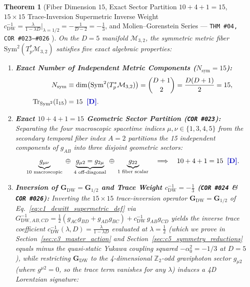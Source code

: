 \documentclass[11pt,a4paper]{article}
\newcommand{\catD}{\text{\textbf{\textcolor{blue!75!black}{[D]}}}}
\theoremstyle{definition}
\theoremstyle{plain}
\newtheorem{theorem}[axiom]{Theorem}
\theoremstyle{remark}
\begin{document}
\begin{theorem}[Fiber Dimension $15$, Exact Sector Partition $10 + 4 + 1 = 15$, $15\times 15$ Trace-Inversion Supermetric Inverse Weight $c_{\mathrm{DW}}^{-1} = \frac{\lambda}{1 - \lambda D}\big|_{\lambda=1/2} = -\frac{1}{D-2} = -\frac{1}{3}$, and Molien--Gorenstein Series --- \texttt{THM~\#04, COR~\#023--\#026} \catD]\label{thm:c1_metric_15_components}\label{thm:c1_metric_splitting}
On the $D = 5$ manifold $\mathcal{M}_{3,2}$, the symmetric metric fiber $\mathrm{Sym}^2(T^*_p\mathcal{M}_{3,2})$ satisfies five exact algebraic properties:
\begin{enumerate}[label=(\roman*)]
  \item \textbf{Exact Number of Independent Metric Components ($N_{\mathrm{sym}} = 15$):}
  \begin{align}
  N_{\mathrm{sym}} &\equiv \dim\!\left(\mathrm{Sym}^2(T^*_p\mathcal{M}_{3,2})\right) = \binom{D+1}{2} = \frac{D(D+1)}{2} = 15, \nonumber \\[3pt]
  \mathrm{Tr}_{\mathrm{Sym}^2}\!\left(\mathbb{I}_{15}\right) &= 15 \;\;\catD. \label{eq:c1_dim_sym2_15}
  \end{align}
  \item \textbf{Exact $10 + 4 + 1 = 15$ Geometric Sector Partition (\texttt{COR~\#023}):}
  Separating the four macroscopic spacetime indices $\mu,\nu \in \{1,3,4,5\}$ from the secondary temporal fiber index $A = 2$ partitions the 15 independent components of $g_{AB}$ into three disjoint geometric sectors:
  \begin{equation}\label{eq:c1_10_4_1_partition}
  \underbrace{g_{\mu\nu}}_{10\text{ macroscopic}} \;\oplus\;
  \underbrace{g_{\mu 2} = g_{2\mu}}_{4\text{ off-diagonal}} \;\oplus\;
  \underbrace{g_{22}}_{1\text{ fiber scalar}}
  \quad \Longrightarrow \quad 10 + 4 + 1 = 15 \;\;\catD.
  \end{equation}
  \item \textbf{Inversion of $\mathbf{G}_{\mathrm{DW}} = \mathbf{G}_{1/2}$ and Trace Weight $c_{\mathrm{DW}}^{-1} = -\frac{1}{3}$ (\texttt{COR~\#024} \& \texttt{COR~\#026}):}
  Inverting the $15\times 15$ trace-inversion operator $\mathbf{G}_{\mathrm{DW}} = \mathbf{G}_{1/2}$ of Eq.~\eqref{eq:c1_dewitt_supermetric_def} via $G_{\mathrm{DW},AB,CD}^{-1} = \frac{1}{2}(g_{AC}g_{BD} + g_{AD}g_{BC}) + c_{\mathrm{DW}}^{-1}\,g_{AB}g_{CD}$ yields the inverse trace coefficient $c_{\mathrm{DW}}^{-1}(\lambda, D) = \frac{\lambda}{1 - \lambda D}$ evaluated at $\lambda = \frac{1}{2}$ (which we prove in Section~\ref{sec:c3_master_action} and Section~\ref{sec:c5_symmetry_reductions} equals minus the quasi-static Yukawa coupling squared $-\alpha_0^2 = -1/3$ at $D = 5$), while restricting $\mathbf{G}_{\mathrm{DW}}$ to the 4-dimensional $\mathbb{Z}_2$-odd graviphoton sector $g_{\mu 2}$ (where $g^{\mu 2} = 0$, so the trace term vanishes for any $\lambda$) induces a 4D Lorentzian signature:

\end{enumerate}
\end{theorem}
\end{document}
